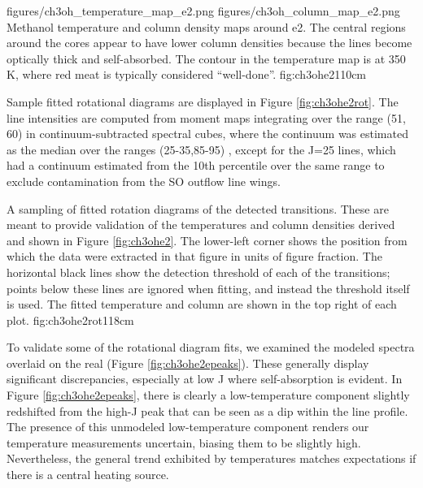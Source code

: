 \documentclass{emulateapj}
\begin{document}
\FigureTwo
{figures/ch3oh_temperature_map_e2.png}
{figures/ch3oh_column_map_e2.png}
{Methanol temperature and column density maps around e2.  The central regions around
the cores appear to have lower column densities because the lines become
optically thick and self-absorbed.  The contour in the temperature map is at
350 K, where red meat is typically considered ``well-done''.}
{fig:ch3ohe2}{1}{10cm}

Sample fitted rotational diagrams are displayed in Figure \ref{fig:ch3ohe2rot}.
The line intensities are computed from moment maps integrating over the range
(51, 60) \kms in continuum-subtracted spectral cubes, where the continuum
was estimated as the median over the ranges (25-35,85-95) \kms, except
for the J=25 lines, which had a continuum estimated from the 10th percentile
over the same range to exclude contamination from the SO outflow line wings.

{A sampling of fitted rotation diagrams of the detected \methanol transitions.
These are meant to provide validation of the temperatures and column densities
derived and shown in Figure \ref{fig:ch3ohe2}.  The lower-left corner shows
the position from which the data were extracted in that figure in units of
figure fraction.  The horizontal black lines show the detection threshold of each
of the transitions; points below these lines are ignored when fitting, and instead
the threshold itself is used.  The fitted temperature and
column are shown in the top right of each plot.
}{fig:ch3ohe2rot}{1}{18cm}

To validate some of the rotational diagram fits, we examined the modeled
spectra overlaid on the real (Figure \ref{fig:ch3ohe2epeaks}).  These generally
display significant discrepancies, especially at low J where self-absorption is
evident.  In Figure \ref{fig:ch3ohe2epeaks}, there is clearly a low-temperature
component slightly redshifted from the high-J peak that can be seen as a dip
within the line profile.  The presence of this unmodeled low-temperature
component renders our \methanol temperature measurements uncertain, biasing
them to be slightly high.  Nevertheless,
the general trend exhibited by \methanol temperatures matches expectations
if there is a central heating source.
\end{document}
